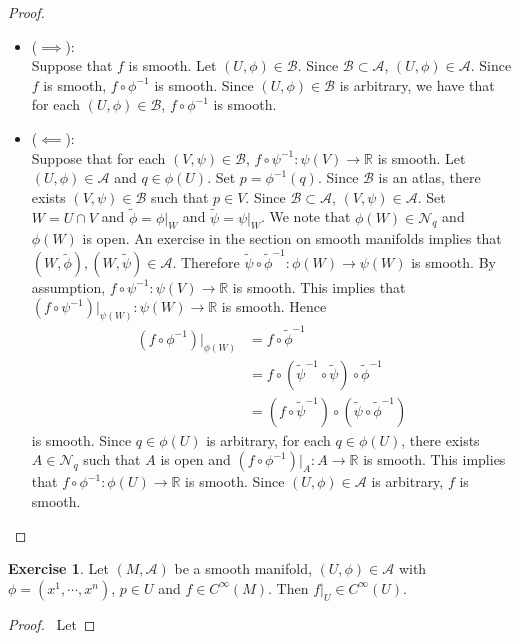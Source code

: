 \documentclass{book}
\theoremstyle{definition}
\newtheorem{ex}[definition]{Exercise}
\newcommand{\R}{\mathbb{R}}
\newcommand{\MA}{\mathcal{A}}
\newcommand{\MB}{\mathcal{B}}
\newcommand{\MN}{\mathcal{N}}
\DeclareMathOperator*{\0}{\mbf{0}}
\DeclareMathOperator*{\1}{\mbf{1}}
\begin{document}
	\begin{proof}\
		\begin{itemize}
			\item ($\implies$): \\
			Suppose that $f$ is smooth. Let $(U, \phi) \in \MB$. Since $\MB \subset \MA$, $(U, \phi) \in \MA$. Since $f$ is smooth, $ f \circ \phi^{-1}$ is smooth. Since $(U, \phi) \in \MB$ is arbitrary, we have that for each $(U, \phi) \in \MB$, $f \circ \phi^{-1}$ is smooth.
			\item ($\impliedby$): \\
			Suppose that for each $(V, \psi) \in \MB$, $f \circ \psi^{-1}: \psi(V) \rightarrow \R$ is smooth. Let $(U, \phi) \in \MA$ and $q \in \phi(U)$. Set $p = \phi^{-1}(q)$. Since $\MB$ is an atlas, there exists $(V, \psi) \in \MB$ such that $p \in V$. Since $\MB \subset \MA$, $(V, \psi) \in \MA$. Set $W = U \cap V$ and $\tilde{\phi} = \phi|_W$ and $\tilde{\psi} = \psi|_W$. We note that $\phi(W) \in \MN_q$ and $\phi(W)$ is open. An exercise in the section on smooth manifolds implies that $(W, \tilde{\phi}), (W, \tilde{\psi}) \in \MA$. Therefore $\tilde{\psi} \circ \tilde{\phi}^{-1}: \phi(W) \rightarrow \psi(W)$ is smooth. By assumption, $f \circ \psi^{-1}: \psi(V) \rightarrow \R$ is smooth. This implies that $(f \circ \psi^{-1})|_{\psi(W)}: \psi(W) \rightarrow \R$ is smooth. Hence
			\begin{align*}
				(f \circ \phi^{-1})|_{\phi(W)}
				& = f \circ \tilde{\phi}^{-1} \\
				& = f \circ (\tilde{\psi}^{-1} \circ \tilde{\psi}) \circ \tilde{\phi}^{-1} \\
				& = (f \circ \tilde{\psi}^{-1}) \circ (\tilde{\psi} \circ \tilde{\phi}^{-1})
			\end{align*}
			is smooth. Since $q \in \phi(U)$ is arbitrary, for each $q \in \phi(U)$, there exists $A \in \MN_q$ such that $A$ is open and $(f \circ \phi^{-1})|_{A}:A \rightarrow \R$ is smooth. This implies that $f \circ \phi^{-1}: \phi(U) \rightarrow \R$ is smooth. Since $(U, \phi) \in \MA$ is arbitrary, $f$ is smooth.
		\end{itemize}
	\end{proof}
	
	\begin{ex}
	Let $(M, \MA)$ be a smooth manifold, $(U, \phi) \in \MA$ with $\phi = (x^1, \cdots, x^n)$, $p \in U$ and $f \in C^{\infty}(M)$. Then $f|_U \in C^{\infty}(U)$.
	\end{ex}
	
	\begin{proof}\
	Let 
	\end{proof}
	
\end{document}
